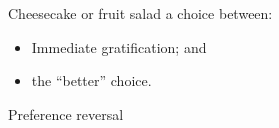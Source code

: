 \pause Cheesecake or fruit salad \pause  a choice between: \bigskip
\begin{itemize}
    \item Immediate gratification; \pause and 
    \item the ``better'' choice. \pause\bigskip
\end{itemize}

Preference reversal
